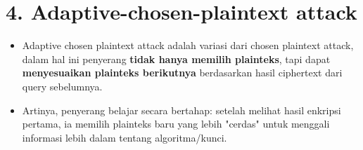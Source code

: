 \documentclass{article}
\begin{document}

\section*{4. Adaptive-chosen-plaintext attack}

\begin{itemize}
    \item Adaptive chosen plaintext attack adalah variasi dari chosen plaintext attack, dalam hal ini penyerang \textbf{tidak hanya memilih plainteks}, tapi dapat \textbf{menyesuaikan plainteks berikutnya} berdasarkan hasil ciphertext dari query sebelumnya.
    \item Artinya, penyerang belajar secara bertahap: setelah melihat hasil enkripsi pertama, ia memilih plainteks baru yang lebih "cerdas" untuk menggali informasi lebih dalam tentang algoritma/kunci.
\end{itemize}
\end{document}
